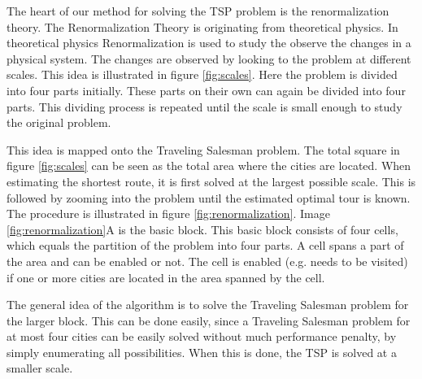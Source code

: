 The heart of our method for solving the TSP problem is the renormalization
theory. The Renormalization Theory is originating from theoretical physics\cite{yoshiyuki1995nms}. In
theoretical physics Renormalization is used to study the observe the changes
in a physical system. The changes are observed by looking to the problem at
different scales. This idea is illustrated in figure \ref{fig:scales}. Here
the problem is divided into four parts initially. These parts on their own can
again be divided into four parts. This dividing process is repeated until the
scale is small enough to study the original problem.

This idea is mapped onto the Traveling Salesman problem. The total square in
figure \ref{fig:scales} can be seen as the total area where the cities are
located. When estimating the shortest route, it is first solved at the largest possible scale. 
This is followed by zooming into the problem until the estimated optimal tour is known. 
The procedure is illustrated in figure \ref{fig:renormalization}. Image 
\ref{fig:renormalization}A is the basic block. This basic block consists of four cells, 
which equals the partition of the problem into four parts. A cell
spans a part of the area and can be enabled or not. The cell is enabled (e.g.
needs to be visited) if one or more cities are located in the area spanned by
the cell.

The general idea of the algorithm is to solve the Traveling Salesman problem
for the larger block. This can be done easily, since a Traveling Salesman
problem for at most four cities can be easily solved without much performance
penalty, by simply enumerating all possibilities. When this is done, the TSP 
is solved at a smaller scale.

